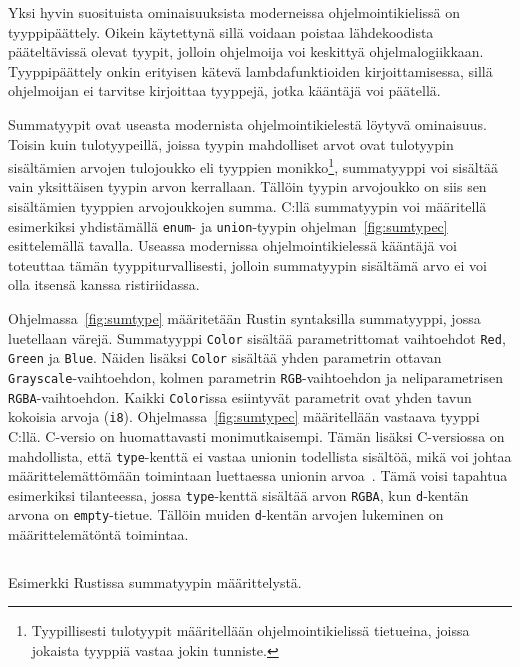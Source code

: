 Yksi hyvin suosituista ominaisuuksista moderneissa ohjelmointikielissä on
tyyppipäättely. Oikein käytettynä sillä voidaan poistaa lähdekoodista
pääteltävissä olevat tyypit, jolloin ohjelmoija voi keskittyä
ohjelmalogiikkaan. Tyyppipäättely onkin erityisen kätevä lambdafunktioiden
kirjoittamisessa, sillä ohjelmoijan ei tarvitse kirjoittaa tyyppejä, jotka
kääntäjä voi päätellä.

Summatyypit ovat useasta modernista
ohjelmointikielestä löytyvä ominaisuus. Toisin kuin
tulotyypeillä, joissa tyypin mahdolliset arvot ovat
tulotyypin sisältämien arvojen tulojoukko eli tyyppien
monikko\footnote{Tyypillisesti tulotyypit määritellään ohjelmointikielissä
tietueina, joissa jokaista tyyppiä vastaa jokin tunniste.},
summatyyppi voi sisältää vain yksittäisen tyypin arvon kerrallaan. Tällöin
tyypin arvojoukko on siis sen sisältämien tyyppien arvojoukkojen summa. C:llä
summatyypin voi määritellä esimerkiksi yhdistämällä \texttt{enum}- ja
\texttt{union}-tyypin ohjelman~\ref{fig:sumtypec} esittelemällä tavalla.
Useassa modernissa ohjelmointikielessä kääntäjä voi toteuttaa tämän
tyyppiturvallisesti, jolloin summatyypin sisältämä arvo ei voi olla itsensä
kanssa ristiriidassa.

Ohjelmassa~\ref{fig:sumtype} määritetään Rustin syntaksilla summatyyppi, jossa
luetellaan värejä. Summatyyppi \texttt{Color} sisältää parametrittomat
vaihtoehdot \texttt{Red}, \texttt{Green} ja \texttt{Blue}. Näiden lisäksi
\texttt{Color} sisältää yhden parametrin ottavan
\texttt{Grayscale}-vaihtoehdon, kolmen parametrin \texttt{RGB}-vaihtoehdon ja
neliparametrisen \texttt{RGBA}-vaihtoehdon. Kaikki \texttt{Color}issa
esiintyvät parametrit ovat yhden tavun kokoisia arvoja (\texttt{i8}).
Ohjelmassa~\ref{fig:sumtypec} määritellään vastaava tyyppi C:llä. C-versio on
huomattavasti monimutkaisempi. Tämän lisäksi C-versiossa on mahdollista, että
\texttt{type}-kenttä ei vastaa unionin todellista sisältöä, mikä voi johtaa
määrittelemättömään toimintaan luettaessa unionin arvoa~\citep[luku
6.7.2.1]{C18}. Tämä voisi tapahtua esimerkiksi tilanteessa, jossa
\texttt{type}-kenttä sisältää arvon \texttt{RGBA}, kun \texttt{d}-kentän arvona
on \texttt{empty}-tietue. Tällöin muiden \texttt{d}-kentän arvojen lukeminen on
määrittelemätöntä toimintaa.

\FloatBarrier

\begin{listing}[ht!]
    \inputminted{Rust}{sumtype.rs}
    \caption{Esimerkki Rustissa summatyypin määrittelystä.}
    \label{fig:sumtype}
\end{listing}

